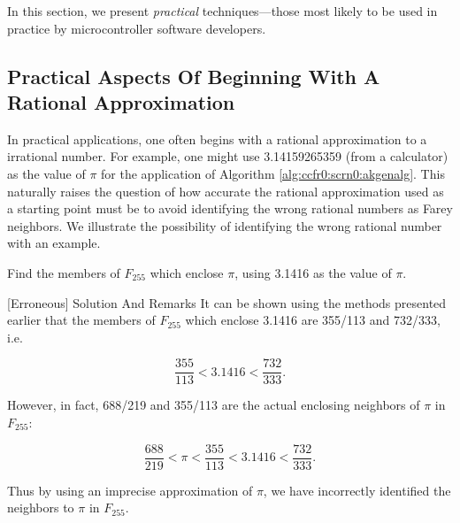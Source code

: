 In this section, we present \emph{practical} techniques---those most likely
to be used in practice by microcontroller software developers.



\subsection{Practical Aspects Of Beginning With A Rational Approximation}
\label{ccfr0:sptq0:sspas0}

In practical applications, one often begins with a rational approximation 
to a irrational number.  
For example, one might use 3.14159265359 (from
a calculator) as the value of $\pi$ for the application of 
Algorithm \ref{alg:ccfr0:scrn0:akgenalg}.  This naturally raises the
question of how accurate the rational approximation used
as a starting point must be to avoid identifying the wrong 
rational numbers as Farey neighbors.  We illustrate the possibility
of identifying the wrong rational number with an example.

\begin{vworkexamplestatement}
\label{ex:ccfr0:sptq0:01}
Find the members of $F_{255}$ which enclose $\pi$, using 
3.1416 as the value of $\pi$.
\end{vworkexamplestatement}
\begin{vworkexampleparsection}{[Erroneous] Solution And Remarks}
It can be shown using the methods presented earlier that
the members of $F_{255}$ which enclose 3.1416 are
355/113 and 732/333, i.e.

\begin{equation}
\frac{355}{113} < 3.1416 < \frac{732}{333} .
\end{equation}

However, in fact, 688/219 and 355/113 are the actual enclosing
neighbors of $\pi$ in $F_{255}$:

\begin{equation}
\frac{688}{219} < \pi < \frac{355}{113} < 3.1416 < \frac{732}{333} .
\end{equation}

Thus by using an imprecise approximation of $\pi$, we have incorrectly
identified the neighbors to $\pi$ in $F_{255}$.
\end{vworkexampleparsection}
\vworkexamplefooter{}


